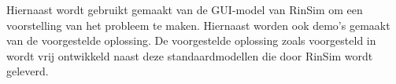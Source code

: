 Hiernaast wordt gebruikt gemaakt van de GUI-model van RinSim om een voorstelling van het probleem te maken. Hiernaast worden ook demo’s gemaakt van de voorgestelde oplossing. De voorgestelde oplossing zoals voorgesteld in \cite{VoorgesteldeOplossing} wordt vrij ontwikkeld naast deze standaardmodellen die door RinSim wordt geleverd.



\cleardoublepage

